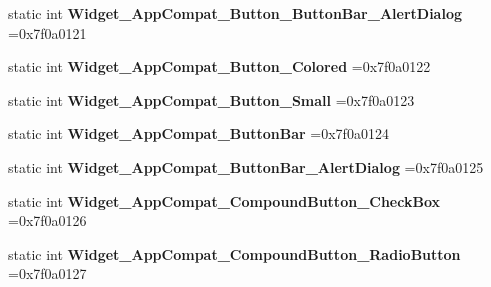 \begin{DoxyCompactItemize}
static int {\bfseries Widget\+\_\+\+App\+Compat\+\_\+\+Button\+\_\+\+Button\+Bar\+\_\+\+Alert\+Dialog} =0x7f0a0121
\item 
\mbox{\label{classandroid_1_1support_1_1graphics_1_1drawable_1_1animated_1_1R_1_1style_a604c8dc44e84ec8aba7a2d5772de67bd}} 
static int {\bfseries Widget\+\_\+\+App\+Compat\+\_\+\+Button\+\_\+\+Colored} =0x7f0a0122
\item 
\mbox{\label{classandroid_1_1support_1_1graphics_1_1drawable_1_1animated_1_1R_1_1style_a41cc8985bcd90483fb218aeae697465e}} 
static int {\bfseries Widget\+\_\+\+App\+Compat\+\_\+\+Button\+\_\+\+Small} =0x7f0a0123
\item 
\mbox{\label{classandroid_1_1support_1_1graphics_1_1drawable_1_1animated_1_1R_1_1style_a13e5887a42186be978620c91efecbf26}} 
static int {\bfseries Widget\+\_\+\+App\+Compat\+\_\+\+Button\+Bar} =0x7f0a0124
\item 
\mbox{\label{classandroid_1_1support_1_1graphics_1_1drawable_1_1animated_1_1R_1_1style_aa7e756ae86056a94c30d824924dc8c11}} 
static int {\bfseries Widget\+\_\+\+App\+Compat\+\_\+\+Button\+Bar\+\_\+\+Alert\+Dialog} =0x7f0a0125
\item 
\mbox{\label{classandroid_1_1support_1_1graphics_1_1drawable_1_1animated_1_1R_1_1style_adf9c3c3c4f42f6bfa72b2b28a3fe5659}} 
static int {\bfseries Widget\+\_\+\+App\+Compat\+\_\+\+Compound\+Button\+\_\+\+Check\+Box} =0x7f0a0126
\item 
\mbox{\label{classandroid_1_1support_1_1graphics_1_1drawable_1_1animated_1_1R_1_1style_a4b7337bfd85dd548563a2e88dc9089ef}} 
static int {\bfseries Widget\+\_\+\+App\+Compat\+\_\+\+Compound\+Button\+\_\+\+Radio\+Button} =0x7f0a0127
\item 
\mbox{\label{classandroid_1_1support_1_1graphics_1_1drawable_1_1animated_1_1R_1_1style_a98054f24995549fb2c685d050575bc14}} 

\end{DoxyCompactItemize}
